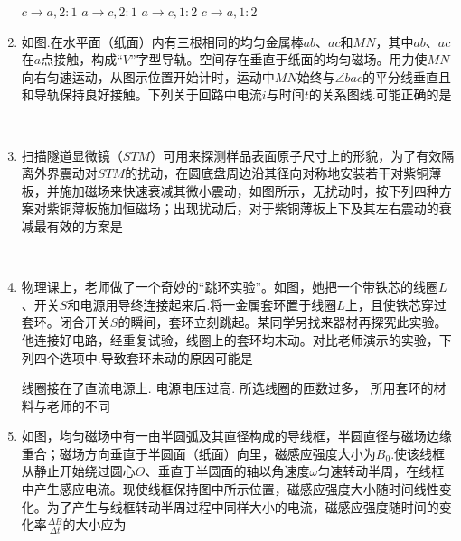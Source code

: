 \begin{enumerate}
\fourchoices
{$ c \rightarrow a , 2: 1 $}
{$ a \rightarrow c , 2: 1 $}
{$ a \rightarrow c , 1: 2 $}
{$ c \rightarrow a , 1: 2 $}

\item 
{}
如图.在水平面（纸面）内有三根相同的均匀金属棒$ ab $、$ ac $和$ MN $，其中$ ab $、$ ac $在$ a $点接触，构成“$ V $”字型导轨。空间存在垂直于纸面的均匀磁场。用力使$ MN $向右匀速运动，从图示位置开始计时，运动中$ MN $始终与$ \angle bac $的平分线垂直且和导轨保持良好接触。下列关于回路中电流$ i $与时间$ t $的关系图线.可能正确的是  
\begin{figure}[h!]
\centering
\\

\end{figure}


\item 
{}
扫描隧道显微镜（$ STM $）可用来探测样品表面原子尺寸上的形貌，为了有效隔离外界震动对$ STM $的扰动，在圆底盘周边沿其径向对称地安装若干对紫铜薄板，并施加磁场来快速衰减其微小震动，如图所示，无扰动时，按下列四种方案对紫铜薄板施加恒磁场；出现扰动后，对于紫铜薄板上下及其左右震动的衰减最有效的方案是  
\begin{figure}[h!]
\centering
\\

\end{figure}




\item 
{}
物理课上，老师做了一个奇妙的“跳环实验”。如图，她把一个带铁芯的线圈$ L $、开关$ S $和电源用导终连接起来后.将一金属套环置于线圈$ L $上，且使铁芯穿过套环。闭合开关$ S $的瞬间，套环立刻跳起。某同学另找来器材再探究此实验。他连接好电路，经重复试验，线圈上的套环均末动。对比老师演示的实验，下列四个选项中.导致套环未动的原因可能是  
\begin{figure}[h!]
\centering

\end{figure}


\fourchoices
{线圈接在了直流电源上.}
{电源电压过高.}
{所选线圈的匝数过多，}
{所用套环的材料与老师的不同}

\item 
{}
如图，均匀磁场中有一由半圆弧及其直径构成的导线框，半圆直径与磁场边缘重合；磁场方向垂直于半圆面（纸面）向里，磁感应强度大小为$ B_{0} $.使该线框从静止开始绕过圆心$ O $、垂直于半圆面的轴以角速度$\omega$匀速转动半周，在线框中产生感应电流。现使线框保持图中所示位置，磁感应强度大小随时间线性变化。为了产生与线框转动半周过程中同样大小的电流，磁感应强度随时间的变化率$\frac { \Delta B } { \Delta t }$的大小应为  
\begin{figure}[h!]
\centering

\end{figure}


\end{enumerate}
